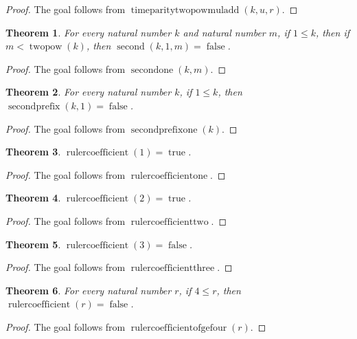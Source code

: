 \documentclass[11pt]{article}
\newtheorem{theorem}{Theorem}[section]
\theoremstyle{definition}
\begin{document}
\begin{proof}
The goal follows from \(\operatorname{timeparitytwopowmuladd}(k, u, r)\).
\end{proof}
\begin{theorem}
\label{ll:observations:second-one}
For every natural number \(k\) and natural number \(m\), if \(1 \le k\), then if \(m < \operatorname{twopow}(k)\), then \(\operatorname{second}(k, 1, m) = \operatorname{false}\).
\end{theorem}
\begin{proof}
The goal follows from \(\operatorname{secondone}(k, m)\).
\end{proof}
\begin{theorem}
\label{ll:observations:second-prefix-one}
For every natural number \(k\), if \(1 \le k\), then \(\operatorname{secondprefix}(k, 1) = \operatorname{false}\).
\end{theorem}
\begin{proof}
The goal follows from \(\operatorname{secondprefixone}(k)\).
\end{proof}
\begin{theorem}
\label{ll:observations:ruler-coefficient-one}
\(\operatorname{rulercoefficient}(1) = \operatorname{true}\).
\end{theorem}
\begin{proof}
The goal follows from \(\operatorname{rulercoefficientone}\).
\end{proof}
\begin{theorem}
\label{ll:observations:ruler-coefficient-two}
\(\operatorname{rulercoefficient}(2) = \operatorname{true}\).
\end{theorem}
\begin{proof}
The goal follows from \(\operatorname{rulercoefficienttwo}\).
\end{proof}
\begin{theorem}
\label{ll:observations:ruler-coefficient-three}
\(\operatorname{rulercoefficient}(3) = \operatorname{false}\).
\end{theorem}
\begin{proof}
The goal follows from \(\operatorname{rulercoefficientthree}\).
\end{proof}
\begin{theorem}
\label{ll:observations:ruler-coefficient-of-ge-four}
For every natural number \(r\), if \(4 \le r\), then \(\operatorname{rulercoefficient}(r) = \operatorname{false}\).
\end{theorem}
\begin{proof}
The goal follows from \(\operatorname{rulercoefficientofgefour}(r)\).
\end{proof}
\end{document}
